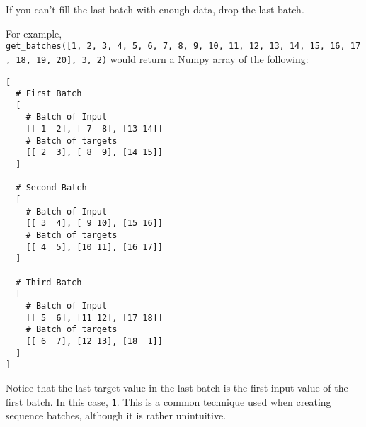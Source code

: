 \documentclass[11pt]{article}
\begin{document}
If you can't fill the last batch with enough data, drop the last batch.

For example,
\texttt{get\_batches({[}1,\ 2,\ 3,\ 4,\ 5,\ 6,\ 7,\ 8,\ 9,\ 10,\ 11,\ 12,\ 13,\ 14,\ 15,\ 16,\ 17,\ 18,\ 19,\ 20{]},\ 3,\ 2)}
would return a Numpy array of the following:

\begin{verbatim}
[
  # First Batch
  [
    # Batch of Input
    [[ 1  2], [ 7  8], [13 14]]
    # Batch of targets
    [[ 2  3], [ 8  9], [14 15]]
  ]

  # Second Batch
  [
    # Batch of Input
    [[ 3  4], [ 9 10], [15 16]]
    # Batch of targets
    [[ 4  5], [10 11], [16 17]]
  ]

  # Third Batch
  [
    # Batch of Input
    [[ 5  6], [11 12], [17 18]]
    # Batch of targets
    [[ 6  7], [12 13], [18  1]]
  ]
]
\end{verbatim}

Notice that the last target value in the last batch is the first input
value of the first batch. In this case, \texttt{1}. This is a common
technique used when creating sequence batches, although it is rather
unintuitive.
\end{document}
